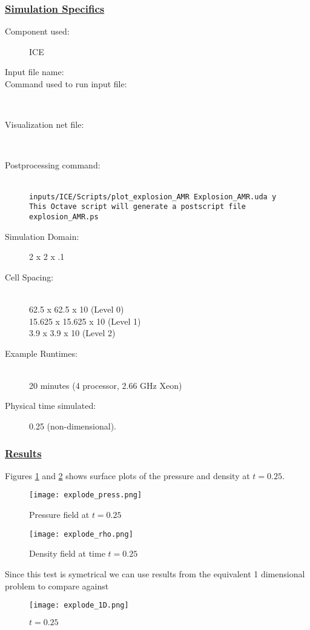 \subsubsection*{\underline{Simulation Specifics}}
\begin{description} 
\item [Component used:] \hfill ICE
\item [Input file name:] \hfill {}
\item [Command used to run input file:]\hfill \\
\item [Visualization net file:]\hfill {}\\
\item [Postprocessing command:]\hfill \\
\tt inputs/ICE/Scripts/plot\_explosion\_AMR Explosion\_AMR.uda y \normalfont \\
This Octave script will generate a postscript file explosion\_AMR.ps


\item [Simulation Domain:]\hfill    2 x 2 x .1
\item [Cell Spacing:]\hfill \\ 
62.5    x 62.5    x 10 (Level 0)\\
15.625  x 15.625  x 10 (Level 1)\\
3.9     x 3.9     x 10 (Level 2)

\item [Example Runtimes:] \hfill \\
 20 minutes   (4 processor, 2.66 GHz Xeon)

\item [Physical time simulated:] \hfill 0.25 (non-dimensional).

\end{description}

\subsubsection*{\underline{Results}}
Figures \ref{fig:pressExplode} and \ref{fig:rhoExplode} shows surface plots of the pressure and density at $t=0.25.$  
\begin{figure}
 \texttt{[image: explode\_press.png]}
\caption{Pressure field at $t=0.25$}
\label{fig:pressExplode}
\end{figure}
%
\begin{figure}
  \texttt{[image: explode\_rho.png]}
  \caption{Density field at time $t=0.25$}
  \label{fig:rhoExplode}
\end{figure}
%
Since this test is symetrical we can use results from the equivalent 1 dimensional problem to compare against
%
\begin{figure}
  \texttt{[image: explode\_1D.png]}
  \caption{$t=0.25$}
  \label{fig:1dExplode}
\end{figure}
\newpage

